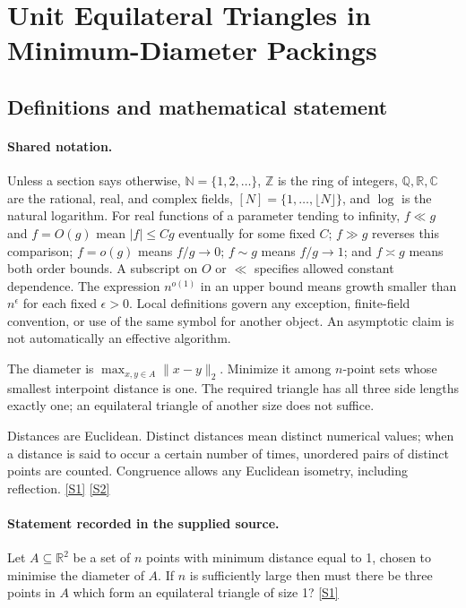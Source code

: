\documentclass[11pt,a4paper]{article}
\newcommand{\N}{\mathbb{N}}
\newcommand{\Z}{\mathbb{Z}}
\newcommand{\Q}{\mathbb{Q}}
\newcommand{\R}{\mathbb{R}}
\newcommand{\C}{\mathbb{C}}
\newcommand{\sref}[2]{\hyperlink{source:#1:#2}{[S#2]}}
\begin{document}
\section{Unit Equilateral Triangles in Minimum-Diameter Packings}\label{statement}


\subsection{Definitions and mathematical statement}

\paragraph{Shared notation.}Unless a section says otherwise, $\N=\{1,2,\ldots\}$,
$\Z$ is the ring of integers, $\Q,\R,\C$ are the rational, real, and complex
fields, $[N]=\{1,\ldots,\lfloor N\rfloor\}$, and $\log$ is the natural
logarithm. For real functions of a parameter tending to infinity,
$f\ll g$ and $f=O(g)$ mean $|f|\leq Cg$ eventually for some fixed $C$;
$f\gg g$ reverses this comparison; $f=o(g)$ means $f/g\to0$;
$f\sim g$ means $f/g\to1$; and $f\asymp g$ means both order bounds.
A subscript on $O$ or $\ll$ specifies allowed constant dependence.
The expression $n^{o(1)}$ in an upper bound means growth smaller than
$n^\epsilon$ for each fixed $\epsilon>0$. Local definitions govern any
exception, finite-field convention, or use of the same symbol for another
object. An asymptotic claim is not automatically an effective algorithm.



The diameter is $\max_{x,y\in A}\|x-y\|_2$. Minimize it among $n$-point sets whose smallest interpoint distance is one. The required triangle has all three side lengths exactly one; an equilateral triangle of another size does not suffice.

Distances are Euclidean. Distinct distances mean distinct numerical values; when a distance is said to occur a certain number of times, unordered pairs of distinct points are counted. Congruence allows any Euclidean isometry, including reflection. \sref{statement}{1} \sref{statement}{2}

\paragraph{Statement recorded in the supplied source.}
Let $A\subseteq\mathbb{R}^2$ be a set of $n$ points with minimum distance equal to 1, chosen to minimise the diameter of $A$. If $n$ is sufficiently large then must there be three points in $A$ which form an equilateral triangle of size 1? \sref{statement}{1}
\end{document}

